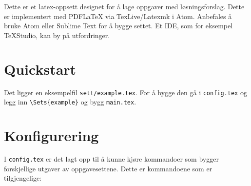 \documentclass{article}
\begin{document}

\lstset{language=[LaTeX]TeX}
\noindent Dette er et latex-oppsett designet for å lage oppgaver med løsningsforslag. Dette er implementert med PDFLaTeX via TexLive/Latexmk i Atom. Anbefales å bruke Atom eller Sublime Text for å bygge settet. Et IDE, som for eksempel TeXStudio, kan by på utfordringer.\\

\section*{Quickstart}
Det ligger en eksempelfil \lstinline{sett/example.tex}. For å bygge den gå i \lstinline{config.tex} og legg inn
\lstinline|\Sets{example}| og bygg \lstinline{main.tex}.\\

\section*{Konfigurering}
I \lstinline|config.tex| er det lagt opp til å kunne kjøre kommandoer som bygger forskjellige utgaver av oppgavesettene.
Dette er kommandoene som er tilgjengelige:\\[2em]
\end{document}
